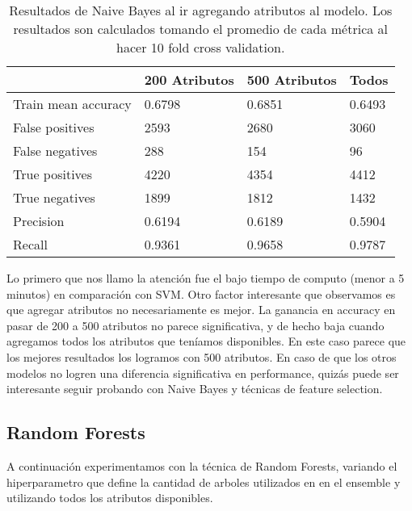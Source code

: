 \documentclass[10pt,a4paper]{article}
\begin{document}
\begin{table}[H]
	\centering
	\begin{tabular}{|l|l|l|l|}
		\hline
		\textbf{}          & \multicolumn{1}{c|}{\textbf{200 Atributos}} & \multicolumn{1}{c|}{\textbf{500 Atributos}} & \multicolumn{1}{c|}{\textbf{Todos}} \\ \hline
Train mean accuracy & 0.6798 & 0.6851 & 0.6493 \\ \hline
False positives     & 2593 & 2680 & 3060 \\ \hline
False negatives     & 288 & 154 & 96 \\ \hline
True positives      & 4220 & 4354 & 4412 \\ \hline
True negatives      & 1899 & 1812 & 1432 \\ \hline
Precision           & 0.6194 & 0.6189 & 0.5904 \\ \hline
Recall              & 0.9361 & 0.9658 & 0.9787 \\ \hline
	\end{tabular}
	\caption{Resultados de Naive Bayes al ir agregando atributos al modelo. Los resultados son calculados tomando el promedio de cada métrica al hacer 10 fold cross validation.}
	\label{naive}
\end{table}

Lo primero que nos llamo la atención fue el bajo tiempo de computo (menor a 5 minutos) en comparación con SVM. Otro factor interesante que observamos es que agregar atributos no necesariamente es mejor. La ganancia en accuracy en pasar de 200 a 500 atributos no parece significativa, y de hecho baja cuando agregamos todos los atributos que teníamos disponibles. En este caso parece que los mejores resultados los logramos con 500 atributos. En caso de que los otros modelos no logren una diferencia significativa en performance, quizás puede ser interesante seguir probando con Naive Bayes y técnicas de feature selection.

\subsection{Random Forests}

A continuación experimentamos con la técnica de Random Forests, variando el hiperparametro que define la cantidad de arboles utilizados en en el ensemble y utilizando todos los atributos disponibles.
\end{document}
